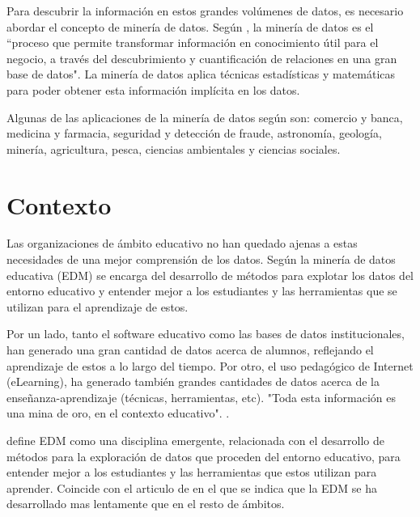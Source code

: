 Para descubrir la información en estos grandes volúmenes de datos, es necesario abordar el concepto de minería de datos.  Según , la minería de datos es el ``proceso que permite transformar información en conocimiento útil para el
negocio, a través del descubrimiento y cuantificación de relaciones en una
gran base de datos". La minería de datos aplica técnicas estadísticas y matemáticas para poder obtener esta información implícita en los datos.

Algunas de las aplicaciones de la minería de datos según \cite{riquelme2006mineria} son:  comercio y banca, medicina y farmacia, seguridad y detección de fraude, astronomía, geología, minería, agricultura, pesca, ciencias ambientales y ciencias sociales.


\section{Contexto}
Las organizaciones de ámbito educativo no han quedado ajenas a estas necesidades de una mejor comprensión de los datos. Según  la minería de datos educativa (EDM) se encarga del desarrollo de métodos para explotar los datos del entorno educativo y entender mejor a los estudiantes y las herramientas que se utilizan para el aprendizaje de estos.

Por un lado, tanto el software educativo como las bases de datos institucionales, han generado una gran cantidad de datos acerca de alumnos, reflejando el aprendizaje de estos a lo largo del tiempo. Por otro, el uso pedagógico de Internet (eLearning), ha generado también grandes cantidades de datos acerca de la enseñanza-aprendizaje (técnicas, herramientas, etc). "Toda esta información es una mina de oro, en el contexto educativo". \cite{romero2010educational}.

 define EDM como una disciplina emergente, relacionada con el desarrollo de métodos para la exploración  de datos que proceden del entorno educativo, para entender mejor a los estudiantes y las herramientas que estos utilizan para aprender. Coincide con el articulo de  en el que se indica que la EDM se ha desarrollado mas lentamente que en el resto de ámbitos.

